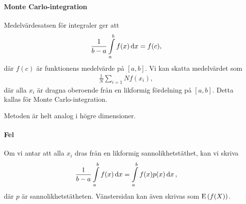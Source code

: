 \paragraph{Monte Carlo-integration}
Medelvärdesatsen för integraler ger att
\begin{align*}
	\frac{1}{b - a}\int\limits_{a}^{b}f(x)\dd{x} = f(c),
\end{align*}
där $f(c)$ är funktionens medelvärde på $[a, b]$. Vi kan skatta medelvärdet som
\begin{align*}
	\frac{1}{N}\sum\limits_{i = 1}{N}f(x_{i}),
\end{align*}
där alla $x_{i}$ är dragna oberoende från en likformig fördelning på $[a, b]$. Detta kallas för Monte Carlo-integration.

Metoden är helt analog i högre dimensioner.

\paragraph{Fel}
Om vi antar att alla $x_{i}$ dras från en likformig sannolikhetstäthet, kan vi skriva
\begin{align*}
	\frac{1}{b - a}\int\limits_{a}^{b}f(x)\dd{x} = \int\limits_{a}^{b}f(x)p(x)\dd{x},
\end{align*}
där $p$ är sannolikhetstätheten. Vänstersidan kan även skrivas som $\text{E}\left(f(X)\right)$.

